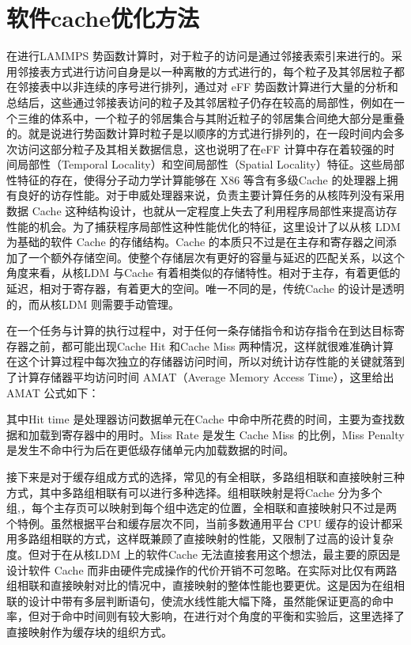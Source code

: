 \section{软件cache优化方法}
在进行LAMMPS 势函数计算时，对于粒子的访问是通过邻接表索引来进行的。采用邻接表方式进行访问自身是以一种离散的方式进行的，每个粒子及其邻居粒子都在邻接表中以非连续的序号进行排列，通过对 eFF 势函数计算进行大量的分析和总结后，这些通过邻接表访问的粒子及其邻居粒子仍存在较高的局部性，例如在一个三维的体系中，一个粒子的邻居集合与其附近粒子的邻居集合间绝大部分是重叠的。就是说进行势函数计算时粒子是以顺序的方式进行排列的，在一段时间内会多次访问这部分粒子及其相关数据信息，这也说明了在eFF 计算中存在着较强的时间局部性（Temporal Locality）和空间局部性（Spatial Locality）特征。这些局部性特征的存在，使得分子动力学计算能够在 X86 等含有多级Cache 的处理器上拥有良好的访存性能。对于申威处理器来说，负责主要计算任务的从核阵列没有采用数据 Cache 这种结构设计，也就从一定程度上失去了利用程序局部性来提高访存性能的机会。为了捕获程序局部性这种性能优化的特征，这里设计了以从核 LDM 为基础的软件 Cache 的存储结构。Cache 的本质只不过是在主存和寄存器之间添加了一个额外存储空间。使整个存储层次有更好的容量与延迟的匹配关系，以这个角度来看，从核LDM 与Cache 有着相类似的存储特性。相对于主存，有着更低的延迟，相对于寄存器，有着更大的空间。唯一不同的是，传统Cache 的设计是透明的，而从核LDM 则需要手动管理。

在一个任务与计算的执行过程中，对于任何一条存储指令和访存指令在到达目标寄存器之前，都可能出现Cache Hit 和Cache Miss 两种情况，这样就很难准确计算在这个计算过程中每次独立的存储器访问时间，所以对统计访存性能的关键就落到了计算存储器平均访问时间 AMAT（Average Memory Access Time），这里给出 AMAT 公式如下：

其中Hit time 是处理器访问数据单元在Cache 中命中所花费的时间，主要为查找数据和加载到寄存器中的用时。Miss Rate 是发生 Cache Miss 的比例，Miss Penalty 是发生不命中行为后在更低级存储单元内加载数据的时间。

接下来是对于缓存组成方式的选择，常见的有全相联，多路组相联和直接映射三种方式，其中多路组相联有可以进行多种选择。组相联映射是将Cache 分为多个组,，每个主存页可以映射到每个组中选定的位置，全相联和直接映射只不过是两个特例。虽然根据平台和缓存层次不同，当前多数通用平台 CPU 缓存的设计都采用多路组相联的方式，这样既兼顾了直接映射的性能，又限制了过高的设计复杂度。但对于在从核LDM 上的软件Cache 无法直接套用这个想法，最主要的原因是设计软件 Cache 而非由硬件完成操作的代价开销不可忽略。在实际对比仅有两路组相联和直接映射对比的情况中，直接映射的整体性能也要更优。这是因为在组相联的设计中带有多层判断语句，使流水线性能大幅下降，虽然能保证更高的命中率，但对于命中时间则有较大影响，在进行对个角度的平衡和实验后，这里选择了直接映射作为缓存块的组织方式。

